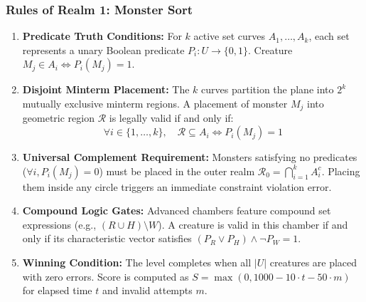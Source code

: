 \documentclass[11pt,a4paper]{article}
\begin{document}
\subsubsection*{Rules of Realm 1: Monster Sort}
\begin{enumerate}
  \item \textbf{Predicate Truth Conditions:} For $k$ active set curves $A_1, \dots, A_k$, each set represents a unary Boolean predicate $P_i : U \to \{0, 1\}$. Creature $M_j \in A_i \iff P_i(M_j) = 1$.
  \item \textbf{Disjoint Minterm Placement:} The $k$ curves partition the plane into $2^k$ mutually exclusive minterm regions. A placement of monster $M_j$ into geometric region $\mathcal{R}$ is legally valid if and only if:
  $$\forall i \in \{1, \dots, k\}, \quad \mathcal{R} \subseteq A_i \iff P_i(M_j) = 1$$
  \item \textbf{Universal Complement Requirement:} Monsters satisfying no predicates ($\forall i, P_i(M_j) = 0$) must be placed in the outer realm $\mathcal{R}_0 = \bigcap_{i=1}^k A_i^c$. Placing them inside any circle triggers an immediate constraint violation error.
  \item \textbf{Compound Logic Gates:} Advanced chambers feature compound set expressions (e.g., $(R \cup H) \setminus W$). A creature is valid in this chamber if and only if its characteristic vector satisfies $(P_R \lor P_H) \land \neg P_W = 1$.
  \item \textbf{Winning Condition:} The level completes when all $|U|$ creatures are placed with zero errors. Score is computed as $S = \max(0, 1000 - 10 \cdot t - 50 \cdot m)$ for elapsed time $t$ and invalid attempts $m$.
\end{enumerate}
\end{document}
